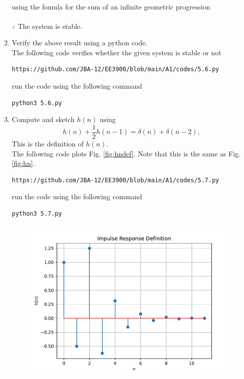 \documentclass[journal,12pt,twocolumn]{IEEEtran}
\renewcommand\thesection{\arabic{section}}
\begin{document}
\begin{enumerate}[label=\thesection.\arabic*]
\begin{align}
\end{align}
using the fomula for the sum of an infinite geometric progression\\\\
$\therefore$ The system is stable.
\item Verify the above result using a python code.\\
\solution The following code verifies whether the given system is stable or not
\begin{lstlisting}
https://github.com/JBA-12/EE3900/blob/main/A1/codes/5.6.py
\end{lstlisting}
run the code using the following command
\begin{lstlisting}
python3 5.6.py
\end{lstlisting}
\item 
Compute and sketch $h(n)$ using 
\begin{equation}
\label{eq:iir_filter_h}
h(n) + \frac{1}{2}h(n-1) = \delta(n) + \delta(n-2), 
\end{equation}
%
This is the definition of $h(n)$.
\\
\solution The following code plots Fig. \ref{fig:hndef}. Note that this is the same as Fig. \ref{fig:hn}. 
%
\begin{lstlisting}
https://github.com/JBA-12/EE3900/blob/main/A1/codes/5.7.py
\end{lstlisting}
run the code using the following command
\begin{lstlisting}
python3 5.7.py
\end{lstlisting}
\begin{figure}[!ht]
\centering
\includegraphics[width=\columnwidth]{./figs/hndef}

\end{figure}
\end{enumerate}
\end{document}
